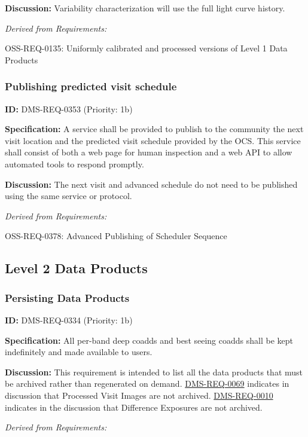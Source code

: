 \documentclass[SE,toc,lsstdraft]{lsstdoc}
\begin{document}
\textbf{Discussion:} Variability characterization will use the full light curve history.

\emph{Derived from Requirements:}

OSS-REQ-0135:
Uniformly calibrated and processed versions of Level 1 Data Products \newline

\subsubsection{Publishing predicted visit schedule}

\label{DMS-REQ-0353}
\textbf{ID:} DMS-REQ-0353 (Priority: 1b)

\textbf{Specification:}
A service shall be provided to publish to the community the next visit location and the predicted visit schedule provided by the OCS. This service shall consist of both a web page for human inspection and a web API to allow automated tools to respond promptly.

\textbf{Discussion:}
The next visit and advanced schedule do not need to be published using the same service or protocol.

\emph{Derived from Requirements:}

OSS-REQ-0378:
Advanced Publishing of Scheduler Sequence \newline

\subsection{Level 2 Data Products}

\subsubsection{Persisting Data Products}

\label{DMS-REQ-0334}
\textbf{ID:} DMS-REQ-0334 (Priority: 1b)

\textbf{Specification:}
All per-band deep coadds and best seeing coadds shall be kept indefinitely and made available to users.

\textbf{Discussion:} This requirement is intended to list all the data products that must be archived rather than regenerated on demand. \hyperref[DMS-REQ-0069]{DMS-REQ-0069} indicates in discussion that Processed Visit Images are not archived. \hyperref[DMS-REQ-0010]{DMS-REQ-0010} indicates in the discussion that Difference Exposures are not archived.

\emph{Derived from Requirements:}
\end{document}
